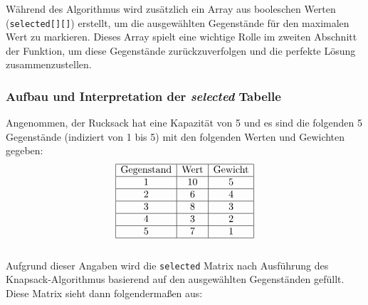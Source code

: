 \begin{itemize}
Während des Algorithmus wird zusätzlich ein Array aus booleschen Werten (\texttt{selected[][]}) erstellt, um die
ausgewählten Gegenstände für den maximalen Wert zu markieren. Dieses Array spielt eine wichtige Rolle im zweiten Abschnitt
der Funktion, um diese Gegenstände zurückzuverfolgen und die perfekte Lösung zusammenzustellen.

\subsubsection*{Aufbau und Interpretation der \textit{selected} Tabelle}
Angenommen, der Rucksack hat eine Kapazität von 5 und es sind die folgenden 5 Gegenstände (indiziert von 1 bis 5) mit den folgenden Werten und Gewichten gegeben:
\[
\begin{array}{|c|c|c|}
\hline
\text{Gegenstand} & \text{Wert} & \text{Gewicht} \\
\hline
1 & 10 & 5 \\
\hline
2 & 6 & 4 \\
\hline
3 & 8 & 3 \\
\hline
4 & 3 & 2 \\
\hline
5 & 7 & 1 \\
\hline
\end{array}
\]
\\
Aufgrund dieser Angaben wird die \texttt{selected} Matrix nach Ausführung des Knapsack-Algorithmus basierend auf den
ausgewählten Gegenständen gefüllt. Diese Matrix sieht dann folgendermaßen aus:


\end{itemize}
